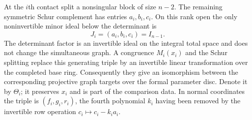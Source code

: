 \documentclass[11pt,reqno]{amsart}
\numberwithin{equation}{section}
\theoremstyle{definition}\newtheorem{definition}[theorem]{Definition}
\theoremstyle{remark}\newtheorem{remark}[theorem]{Remark}
\begin{document}
At the $i$th contact split a nonsingular block of size $n-2$. The
remaining symmetric Schur complement has entries $a_i,b_i,c_i$.
On this rank open the only noninvertible minor ideal below the
determinant is
\[
                  J_i=(a_i,b_i,c_i)=I_{n-1}.
\]
The determinant factor is an invertible ideal on the integral total
space and does not change the simultaneous graph. A congruence
$M_i(x_i)$ and the Schur splitting replace this generating triple
by an invertible linear transformation over the completed base
ring. Consequently they give an isomorphism between the corresponding
projective graph targets over the formal parameter disc. Denote it
by $\Theta_i$; it preserves $x_i$ and is part of the comparison data.
In normal coordinates the triple is $(f_i,g_i,r_i)$, the fourth
polynomial $k_i$ having been removed by the invertible row operation
$c_i\mapsto c_i-k_i a_i$.
\end{document}
